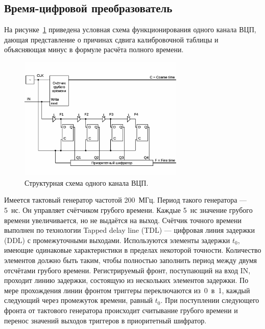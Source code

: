 \subsection{Время-цифровой преобразователь}\label{sec:secTDC}

На рисунке~\ref{fig:TDCscheme} приведена условная схема функционирования одного канала ВЦП, дающая представление о причинах сдвига калибровочной таблицы и объясняющая минус в формуле расчёта полного времени.

\begin{figure}[H]
\centering
\includegraphics[width=0.7\textwidth]{pictures/TDC.eps}
\caption{Структурная схема одного канала ВЦП.}
\label{fig:TDCscheme}
\end{figure}

Имеется тактовый генератор частотой 200~МГц. Период такого генератора --- 5~нс. Он управляет счётчиком грубого времени. Каждые 5~нс значение грубого времени увеличивается, но не выдаётся на выход. Счётчик точного времени выполнен по технологии Tapped delay line (TDL) --- цифровая линия задержки (DDL) с промежуточными выходами. Используются элементы задержки $ t_{0} $, имеющие одинаковые характеристики в пределах некоторой точности. Количество элементов должно быть таким, чтобы полностью заполнить период между двумя отсчётами грубого времени. Регистрируемый фронт, поступающий на вход IN, проходит линию задержки, состоящую из нескольких элементов задержки. По мере прохождения линии фронтом триггеры переключаются из~0~в~1, каждый следующий через промежуток времени, равный $ t_{0} $. При поступлении следующего фронта от тактового генератора происходит считывание грубого времени и перенос значений выходов триггеров в приоритетный шифратор.

